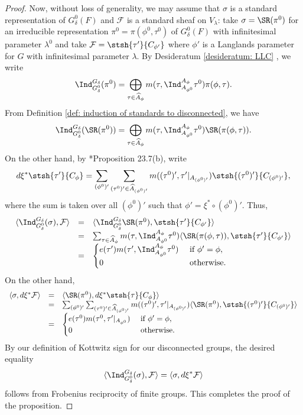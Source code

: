 \documentclass[11pt,letterpaper]{amsart}
\numberwithin{equation}{section}
\begin{document}
\begin{proof}
Now, without loss of generality, we may assume that $\sigma$ is a standard representation of $G_\delta^0(F)$ and $\mathcal{F}$ is a standard sheaf on $V_{\lambda}$: 
take $\sigma = \SR(\pi^0)$ for an irreducible representation $\pi^0=\pi(\phi^0, \tau^0)$ of $G_\delta^0(F)$ with infinitesimal parameter $\lambda^0$ and take $\mathcal{F} = \stsh{\tau'}{C_{\phi'}}$ where $\phi'$ is a Langlands parameter for $G$ with infinitesimal parameter $\lambda$.
By Desideratum \ref{desideratum: LLC} \RES, we write
\[ \Ind_{G_\delta^0}^{G_\delta}(\pi^0) = \bigoplus_{\tau \in \widehat{A}_{\phi}}m(\tau, \Ind_{A_{\phi^0}}^{A_{\phi}}\tau^0) \pi(\phi,\tau).\]
From Definition \ref{def: induction of standards to disconnected}, we have 
\[ \Ind_{G_\delta^0}^{G_\delta}(\SR(\pi^0)) = \bigoplus_{\tau \in \widehat{A}_{\phi}}m(\tau, \Ind_{A_{\phi^0}}^{A_{\phi}}\tau^0) \SR(\pi(\phi,\tau)). \]
On the other hand, by \cite{ABV92}*{Proposition 23.7(b)}, write
\[ d\xi^* \stsh{\tau'}{C_\phi} = \sum_{(\phi^0)'}\sum_{(\tau^0)' \in \widehat{A}_{ (\phi^0)'}} m((\tau^0)', \tau'|_{A_{(\phi^0)'}} ) \stsh{(\tau^0)'}{C_{(\phi^0)'}}, \]
where the sum is taken over all $(\phi^0)'$ such that $\phi'= \xi^{\ast} \circ (\phi^0)'$.
Thus,
\[
\begin{array}{rcl}
\langle \Ind_{G_\delta^0}^{G_\delta}(\sigma), \mathcal{F} 
\rangle
&=& 
\langle \Ind_{G_\delta^0}^{G_\delta}\SR(\pi^0), \stsh{\tau'}{C_{\phi'}} 
\rangle \\
&=& 
\sum_{\tau \in \widehat{A}_{\phi}} 
m(\tau, \Ind_{A_{\phi^0}}^{A_{\phi}}\tau^0) \langle \SR(\pi(\phi,\tau)), \stsh{\tau'}{C_{\phi'}}  
\rangle\\
&=& \begin{cases}
   e(\tau') m(\tau', \Ind_{A_{\phi^0}}^{A_{\phi}}\tau^0) & \text{ if }\phi'=\phi,\\
   0 & \text{ otherwise.}
\end{cases}
\end{array}
\]    
On the other hand,
\[
\begin{array}{rcl}
\langle \sigma , d\xi^* \mathcal{F} \rangle
&=&
\langle \SR(\pi^0) , d\xi^* \stsh{\tau}{C_\phi} \rangle 
\\
&=& 
\sum_{(\phi^0)'}\sum_{(\tau^0)' \in \widehat{A}_{ (\phi^0)'}} m((\tau^0)', \tau'|_{A_{(\phi^0)'}} ) \langle \SR(\pi^0) , \stsh{(\tau^0)'}{C_{(\phi^0)'}} \rangle\\
&=& \begin{cases}
  e(\tau^0) m(\tau^0, \tau'|_{A_{\phi^0}}) & \text{ if }\phi'=\phi,\\
   0 & \text{ otherwise.}
\end{cases}
\end{array}
\]
By our definition of Kottwitz sign for our disconnected groups, the desired equality
\[
    \langle \Ind_{G_\delta^0}^{G_\delta}(\sigma), \mathcal{F} \rangle
    =
    \langle \sigma , d\xi^* \mathcal{F}\rangle
\]
follows from Frobenius reciprocity of finite groups. This completes the proof of the proposition.
\end{proof}
\end{document}
